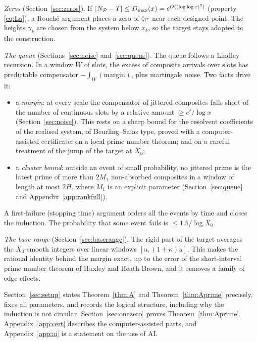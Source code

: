 \emph{Zeros} (Section~\ref{sec:zeros}). If $|N_{\mathcal{P}}-T|\le D_{\max}(x)=e^{O((\log\log x)^2)}$ (property \eqref{eq:La}), a Rouch\'e argument places a zero
of $\zeta_{\mathcal{P}}$ near each designed point. The heights $\gamma_k$ are chosen from the system below $x_k$, so the target stays
adapted to the construction.

\emph{The queue} (Sections~\ref{sec:noise} and~\ref{sec:queue}). The queue follows a Lindley recursion. In a window $W$ of slots, the
excess of composite arrivals over slots has predictable compensator $-\int_W(\text{margin})$, plus martingale noise. Two facts drive it:
\begin{itemize}
\item a \emph{margin}: at every scale the compensator of jittered composites falls short of the number of continuous slots by
a relative amount $\ge c'/\log x$ (Section~\ref{sec:noise}). This rests on a sharp bound for the resolvent coefficients of the
realised system, of Beurling--Saias type, proved with a computer-assisted certificate; on a local prime number theorem; and on
a careful treatment of the jump of the target at $X_0$;
\item a \emph{cluster bound}: outside an event of small probability, no jittered prime is the latest prime of more than
$2M_1$ non-absorbed composites in a window of length at most $2H$, where $M_1$ is an explicit parameter (Section~\ref{sec:queue} and
Appendix~\ref{app:rankfull}).
\end{itemize}
A first-failure (stopping time) argument orders all the events by time and closes the induction. The probability that some
event fails is $\le1.5/\log X_0$.

\emph{The base range} (Section~\ref{sec:baserange}). The rigid part of the target averages the $X_0$-smooth integers over linear
windows $[u,(1+\kappa)u]$. This makes the rational identity behind the margin exact, up to the error of the short-interval
prime number theorem of Huxley and Heath-Brown, and it removes a family of edge effects.

Section~\ref{sec:setup} states Theorem~\ref{thm:A} and Theorem~\ref{thm:Aprime} precisely, fixes all parameters, and records the
logical structure, including why the induction is not circular. Section~\ref{sec:onezero} proves Theorem~\ref{thm:Aprime}. Appendix~\ref{app:cert} describes the computer-assisted parts, and Appendix~\ref{app:ai} is a
statement on the use of AI.
\par\endgroup
